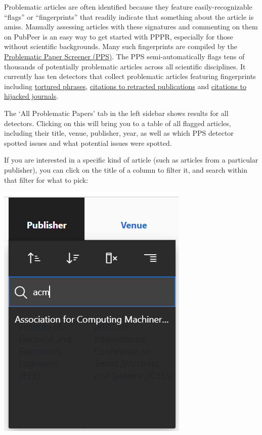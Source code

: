 \documentclass[letterpaper, 12pt]{article}
\begin{document}
Problematic articles are often identified because they feature easily-recognizable ``flags'' or ``fingerprints'' that readily indicate that something about the article is amiss. Manually assessing articles with these signatures and commenting on them on PubPeer is an easy way to get started with PPPR, especially for those without scientific backgrounds. Many such fingerprints are compiled by the \href{https://www.irit.fr/~Guillaume.Cabanac/problematic-paper-screener/}{Problematic Paper Screener (PPS)}. The PPS semi-automatically flags tens of thousands of potentially problematic articles across all scientific disciplines. It currently has ten detectors that collect problematic articles featuring fingerprints including \href{https://www.irit.fr/~Guillaume.Cabanac/problematic-paper-screener/tortured}{tortured phrases}, \href{https://www.irit.fr/~Guillaume.Cabanac/problematic-paper-screener/feet-of-clay}{citations to retracted publications} and \href{https://www.irit.fr/~Guillaume.Cabanac/problematic-paper-screener/citejacked}{citations to hijacked journals}. 

The `All Problematic Papers' tab in the left sidebar shows results for all detectors. Clicking on this will bring you to a table of all flagged articles, including their title, venue, publisher, year, as well as which PPS detector spotted issues and what potential issues were spotted.



If you are interested in a specific kind of article (such as articles from a particular publisher), you can click on the title of a column to filter it, and search within that filter for what to pick:

\includegraphics[width=0.3\linewidth]{img/getting_started/Filtering.png}
\end{document}
